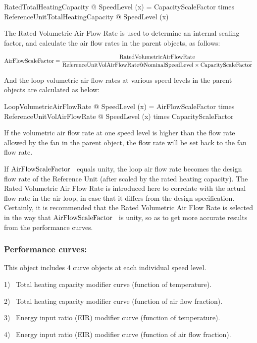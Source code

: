 RatedTotalHeatingCapacity @ SpeedLevel (x) = CapacityScaleFactor times ReferenceUnitTotalHeatingCapacity @ SpeedLevel (x)

The Rated Volumetric Air Flow Rate is used to determine an internal scaling factor, and calculate the air flow rates in the parent objects, as follows:

\begin{equation}
{\rm{AirFlowScaleFactor}} = \frac{{{\rm{RatedVolumetricAirFlowRate}}}}{{{\rm{ReferenceUnitVolAirFlowRate}}@{\rm{NominalSpeedLevel}} \times {\rm{CapacityScaleFactor}}}}
\end{equation}

And the loop volumetric air flow rates at various speed levels in the parent objects are calculated as below:

LoopVolumetricAirFlowRate @ SpeedLevel (x) = AirFlowScaleFactor times ReferenceUnitVolAirFlowRate @ SpeedLevel (x) times CapacityScaleFactor

If the volumetric air flow rate at one speed level is higher than the flow rate allowed by the fan in the parent object, the flow rate will be set back to the fan flow rate.

If \({\rm{AirFlowScaleFactor}}\) ~equals unity, the loop air flow rate becomes the design flow rate of the Reference Unit (after scaled by the rated heating capacity). The Rated Volumetric Air Flow Rate is introduced here to correlate with the actual flow rate in the air loop, in case that it differs from the design specification. Certainly, it is recommended that the Rated Volumetric Air Flow Rate is selected in the way that \({\rm{AirFlowScaleFactor}}\) ~is unity, so as to get more accurate results from the performance curves.

\subsubsection{Performance curves:}\label{performance-curves-201605050922}

This object includes 4 curve objects at each individual speed level.

1)~ Total heating capacity modifier curve (function of temperature).

2)~ Total heating capacity modifier curve (function of air flow fraction).

3)~ Energy input ratio (EIR) modifier curve (function of temperature).

4)~ Energy input ratio (EIR) modifier curve (function of air flow fraction).

